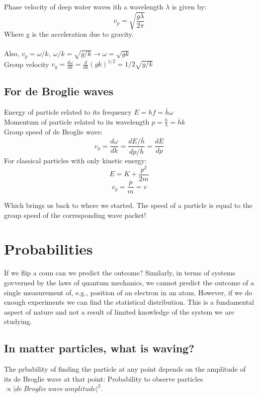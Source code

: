 \documentclass[class=article,crop=false]{standalone}
\begin{document}
\begin{question}
	Phase velocity of deep water waves ith a wavelength $\lambda$ is given by:
	$$ v_p = \sqrt{\frac{g\lambda}{2\pi}} $$ 
	Where g is the acceleration due to gravity. \\ \\

	Also, $v_p = \omega/k,\ \omega/k = \sqrt{g/k} \rightarrow \omega = \sqrt{gk} $\\
	Group velocity $v_g = \frac{d\omega}{dk} = \frac{d}{dk}(gk)^{1/2} = 1/2 \sqrt{g/k}$
\end{question}

\subsection{For de Broglie waves}
Energy of particle related to its frequency $ E = hf = \bar{h}\omega$ \\
Momentum of particle related to its wavelength $p = \frac{h}{\lambda} = \bar{h}k$ \\
Group speed of de Broglie wave:
$$ v_g = \frac{d\omega}{dk} = \frac{d E/\bar{h}}{dp/\bar{h}} = \frac{dE}{dp} $$
For classical particles with only kinetic energy:
$$ E = K + \frac{p^2}{2m} $$
$$ v_g = \frac{p}{m} = v $$

Which brings us back to where we started. The speed of a particle is equal to the group speed of the corresponding wave packet!


\section{Probabilities}
If we flip a coun can we predict the outcome? Similarly, in terms of systems govverned by the laws of quantum mechanics, we cannot predict the outcome of a single measurement of, e.g., position of an electron in an atom. However, if we do enough experiments we can find the statistical distribution. This is a fundamental aspect of nature and not a result of limited knowledge of the system we are studying.\\

\subsection{In matter particles, what is waving?}
The prbability of finding the particle at any point depends on the amplitude of its de Broglie wave at that point: Probability to observe particles $\propto |de\ Broglie\ wave\ amplitude|^2$. \\
\end{document}
